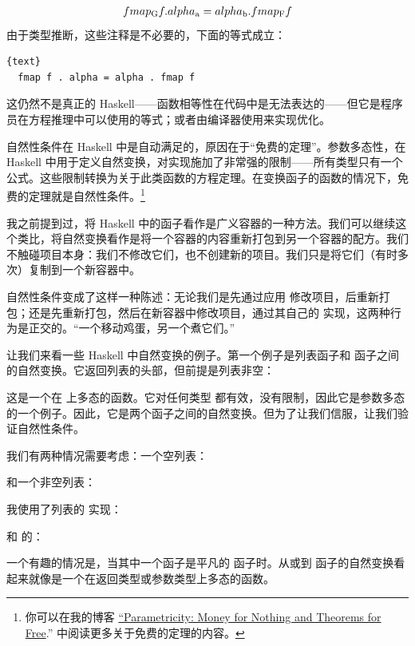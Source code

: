 \begin{align}
  fmap\textsubscript{G} f . alpha\textsubscript{a} = alpha\textsubscript{b} . fmap\textsubscript{F} f
\end{align}
由于类型推断，这些注释是不必要的，下面的等式成立：

\begin{lstlisting}{text}
  fmap f . alpha = alpha . fmap f
\end{lstlisting}
这仍然不是真正的 Haskell——函数相等性在代码中是无法表达的——但它是程序员在方程推理中可以使用的等式；或者由编译器使用来实现优化。

自然性条件在 Haskell 中是自动满足的，原因在于“免费的定理”。参数多态性，在 Haskell 中用于定义自然变换，对实现施加了非常强的限制——所有类型只有一个公式。这些限制转换为关于此类函数的方程定理。在变换函子的函数的情况下，免费的定理就是自然性条件。\footnote{
  你可以在我的博客 \href{https://bartoszmilewski.com/2014/09/22/parametricity-money-for-nothing-and-theorems-for-free/}{``Parametricity:
  Money for Nothing and Theorems for Free}.'' 中阅读更多关于免费的定理的内容。}

我之前提到过，将 Haskell 中的函子看作是广义容器的一种方法。我们可以继续这个类比，将自然变换看作是将一个容器的内容重新打包到另一个容器的配方。我们不触碰项目本身：我们不修改它们，也不创建新的项目。我们只是将它们（有时多次）复制到一个新容器中。

自然性条件变成了这样一种陈述：无论我们是先通过应用  修改项目，后重新打包；还是先重新打包，然后在新容器中修改项目，通过其自己的  实现，这两种行为是正交的。“一个移动鸡蛋，另一个煮它们。”

让我们来看一些 Haskell 中自然变换的例子。第一个例子是列表函子和  函子之间的自然变换。它返回列表的头部，但前提是列表非空：

这是一个在  上多态的函数。它对任何类型  都有效，没有限制，因此它是参数多态的一个例子。因此，它是两个函子之间的自然变换。但为了让我们信服，让我们验证自然性条件。

我们有两种情况需要考虑：一个空列表：


和一个非空列表：


我使用了列表的  实现：

和  的：

一个有趣的情况是，当其中一个函子是平凡的  函子时。从或到  函子的自然变换看起来就像是一个在返回类型或参数类型上多态的函数。

